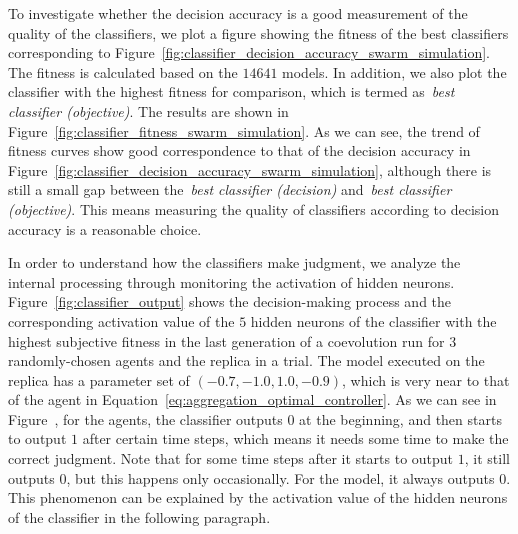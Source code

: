 To investigate whether the decision accuracy is a good measurement of the quality of the classifiers, we plot a figure showing the fitness of the best classifiers corresponding to Figure~\ref{fig:classifier_decision_accuracy_swarm_simulation}. The fitness is calculated based on the $14641$ models. In addition, we also plot the classifier with the highest fitness for comparison, which is termed as~\textit{best classifier (objective)}. The results are shown in Figure~\ref{fig:classifier_fitness_swarm_simulation}. As we can see, the trend of fitness curves show good correspondence to that of the decision accuracy in Figure~\ref{fig:classifier_decision_accuracy_swarm_simulation}, although there is still a small gap between the~\textit{best classifier (decision)} and~\textit{best classifier (objective)}. This means measuring the quality of classifiers according to decision accuracy is a reasonable choice.

In order to understand how the classifiers make judgment, we analyze the internal processing through monitoring the activation of hidden neurons. Figure~\ref{fig:classifier_output} shows the decision-making process and the corresponding activation value of the $5$ hidden neurons of the classifier with the highest subjective fitness in the last generation of a coevolution run for $3$ randomly-chosen agents and the replica in a trial. The model executed on the replica has a parameter set of $(-0.7, -1.0, 1.0, -0.9)$, which is very near to that of the agent in Equation~\eqref{eq:aggregation_optimal_controller}. As we can see in Figure~, for the agents, the classifier outputs $0$ at the beginning, and then starts to output $1$ after certain time steps, which means it needs some time to make the correct judgment. Note that for some time steps after it starts to output $1$, it still outputs $0$, but this happens only occasionally. For the model, it always outputs $0$.  This phenomenon can be explained by the activation value of the hidden neurons of the classifier in the following paragraph.

